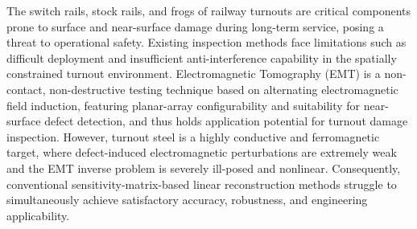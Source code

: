 \setlength{\baselineskip}{20pt}

\begin{englishabstract}
The switch rails, stock rails, and frogs of railway turnouts are critical components prone to surface and near-surface damage during long-term service, posing a threat to operational safety. Existing inspection methods face limitations such as difficult deployment and insufficient anti-interference capability in the spatially constrained turnout environment. Electromagnetic Tomography (EMT) is a non-contact, non-destructive testing technique based on alternating electromagnetic field induction, featuring planar-array configurability and suitability for near-surface defect detection, and thus holds application potential for turnout damage inspection. However, turnout steel is a highly conductive and ferromagnetic target, where defect-induced electromagnetic perturbations are extremely weak and the EMT inverse problem is severely ill-posed and nonlinear. Consequently, conventional sensitivity-matrix-based linear reconstruction methods struggle to simultaneously achieve satisfactory accuracy, robustness, and engineering applicability.


\end{englishabstract}
